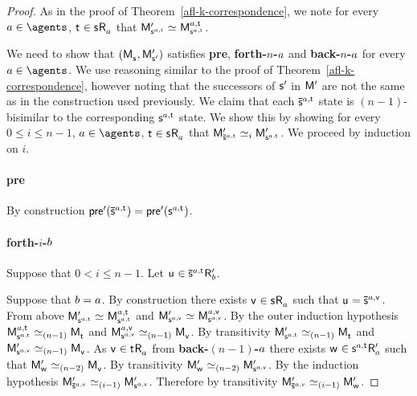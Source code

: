 \begin{proof}
As in the proof of Theorem~\ref{afl-k-correspondence}, we note for every $\agentA \in \agents$, $\aStateT \in \aStateS \aAccessibility{\agentA}$ that $\aPModelP{\aStateS[\agentA,\aStateT]} \bisimilar \aPModel[\agentA,\aStateT]{\aStateS[\agentA,\aStateT]}$.

We need to show that $(\aPModel{\aStateS}, \aPModelP{\aStateSP})$ satisfies {\bf pre}, {\bf forth-$n$-$a$} and {\bf back-$n$-$a$} for every $\agentA \in \agents$.
We use reasoning similar to the proof of Theorem~\ref{afl-k-correspondence}, however noting that the successors of ${\mathsf{{s}}^{\prime}}$ in ${\mathsf{M}^{\prime}}$ are not the same as in the construction used previously.
We claim that each $\aPStateS[\agentA,\aStateT]$ state is $(n-1)$-bisimilar to the corresponding $\aStateS[\agentA,\aStateT]$ state.
We show this by showing for every $0 \leq i \leq n - 1$, $\agentA \in \agents$, $\aStateT \in \aStateS \aAccessibility{\agentA}$ that $\aPModelP{\aPStateS[\agentA,\aStateT]} \bisimilar[i] \aPModelP{\aStateS[\agentA,\aStateT]}$.
We proceed by induction on $i$.

\paragraph{pre} By construction $\aPreconditionP(\aPStateS[\agentA, \aStateT]) = \aPreconditionP(\aStateS[\agentA,\aStateT])$.

\paragraph{forth-$i$-$b$} Suppose that $0 < i \leq n - 1$. Let $\aStateU \in \aPStateS[\agentA,\aStateT] \aAccessibilityP{\agentB}$. 

Suppose that $b = a$. 
By construction there exists $\aStateV \in \aStateS \aAccessibility{\agentA}$ such that $\aStateU = \aPStateS[\agentA,\aStateV]$.
From above $\aPModelP{\aStateS[\agentA,\aStateT]} \bisimilar \aPModel[\agentA,\aStateT]{\aStateS[\agentA,\aStateT]}$ and $\aPModelP{\aStateS[\agentA,\aStateV]} \bisimilar \aPModel[\agentA,\aStateV]{\aStateS[\agentA,\aStateV]}$.
By the outer induction hypothesis $\aPModel[\agentA,\aStateT]{\aStateS[\agentA,\aStateT]} \bisimilar[(n - 1)] \aPModel{\aStateT}$ and $\aPModel[\agentA,\aStateV]{\aStateS[\agentA,\aStateV]} \bisimilar[(n - 1)] \aPModel{\aStateV}$.
By transitivity $\aPModelP{\aStateS[\agentA,\aStateT]} \bisimilar[(n - 1)] \aPModel{\aStateT}$ and $\aPModelP{\aStateS[\agentA,\aStateV]} \bisimilar[(n - 1)] \aPModel{\aStateV}$.
As $\aStateV \in \aStateT \aAccessibility{\agentA}$ from {\bf back-$(n - 1)$-$a$} there exists $\aStateW \in \aStateS[\agentA,\aStateT] \aAccessibilityP{\agentA}$ such that $\aPModelP{\aStateW} \bisimilar[(n - 2)] \aPModel{\aStateV}$.
By transitivity $\aPModelP{\aStateW} \bisimilar[(n - 2)] \aPModelP{\aStateS[\agentA,\aStateV]}$.
By the induction hypothesis $\aPModelP{\aPStateS[\agentA,\aStateV]} \bisimilar[(i - 1)] \aPModelP{\aStateS[\agentA,\aStateV]}$.
Therefore by transitivity $\aPModelP{\aPStateS[\agentA,\aStateV]} \bisimilar[(i - 1)] \aPModelP{\aStateW}$.


\end{proof}
